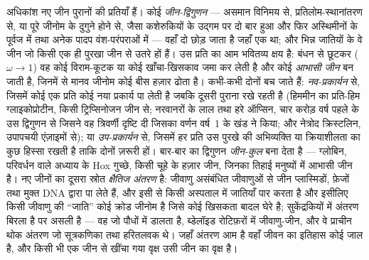 \begin{definition}[द्विगुणन, कुल और अंतरण]\label{def:b3:molecular-evolution:duplication}
अधिकांश नए जीन पुरानों की प्रतियाँ हैं। कोई \emph{जीन-द्विगुणन} ---
असमान विनिमय से, प्रतिलोम-स्थानांतरण से, या पूरे जीनोम के दुगुने होने
से, जैसा कशेरुकियों के उद्गम पर दो बार हुआ और फिर अस्थिमीनों के पूर्वज
में तथा अनेक पादप वंश-परंपराओं में --- वहाँ दो  छोड़ जाता है
जहाँ एक था; और भिन्न जातियों के वे जीन जो किसी एक ही पुरखा जीन से उतरे
हों  हैं। उस प्रति का आम भवितव्य क्षय है: बंधन से छूटकर
($\omega \to 1$) वह कोई विराम-कूटक या कोई खाँचा-खिसकाव जमा कर लेती है
और कोई \emph{आभासी जीन} बन जाती है, जिनमें से मानव जीनोम कोई बीस हज़ार
ढोता है। कभी-कभी दोनों बच जाते हैं: \emph{नव-प्रकार्यन} से, जिसमें कोई
एक प्रति कोई नया प्रकार्य पा लेती है जबकि दूसरी पुराना रखे रहती है
(हिममीन का प्रति-हिम ग्लाइकोप्रोटीन, किसी ट्रिप्सिनोजन जीन से; नरवानरों
के लाल तथा हरे ऑप्सिन, चार करोड़ वर्ष पहले के उस द्विगुणन से जिसने वह
त्रिवर्णी दृष्टि दी जिसका वर्णन वर्ष~1 के खंड ने किया; और नेत्रोद
क्रिस्टलिन, उपापचयी एंज़ाइमों से); या \emph{उप-प्रकार्यन} से, जिसमें हर
प्रति उस पुरखे की अभिव्यक्ति या क्रियाशीलता का कुछ हिस्सा रखती है ताकि
दोनों ज़रूरी हों। बार-बार का द्विगुणन \emph{जीन-कुल} बना देता है ---
ग्लोबिन, परिवर्धन वाले अध्याय के Hox गुच्छे, किसी चूहे के हज़ार  जीन, जिनका तिहाई मनुष्यों में आभासी जीन है। नए जीनों का दूसरा
स्रोत \emph{क्षैतिज अंतरण} है: जीवाणु असंबंधित जीवाणुओं से जीन
प्लास्मिडों, फ़ेजों तथा मुक्त DNA द्वारा पा लेते हैं, और इसी से किसी
अस्पताल में  जातियाँ पार करता है और इसीलिए किसी
जीवाणु की ``जाति'' कोई क्रोड जीनोम है जिसे कोई खिसकता बादल घेरे है;
सुकेंद्रकियों में अंतरण बिरला है पर असली है --- वह  जो
\emph{} पौधों में डालता है, ब्डेलॉइड रोटिफ़रों में
जीवाणु-जीन, और वे प्राचीन थोक अंतरण जो सूत्रकणिका तथा हरितलवक थे। जहाँ
अंतरण आम है वहाँ जीवन का इतिहास कोई जाल है, और किसी भी एक जीन से खींचा
गया वृक्ष उसी जीन का वृक्ष है।
\end{definition}


